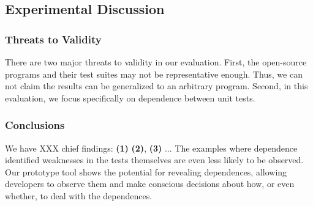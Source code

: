 \subsection{Experimental Discussion}

\subsubsection{Threats to Validity}

There are two major threats to validity in our evaluation.
First, the  open-source
programs and their test suites may not be
representative enough. Thus, we can not claim the results
can be generalized to an arbitrary program.
Second, in this evaluation, we focus specifically on
dependence between unit tests.

\subsubsection{Conclusions}


We have XXX chief findings: \textbf{(1)}
\textbf{(2)}, \textbf{(3)} ...
The examples where dependence identified weaknesses in the tests themselves
are even less likely to be observed.  
Our prototype tool shows
the potential for revealing dependences, allowing
developers to observe them and make conscious decisions about how, or even whether,
to deal with the dependences. 
